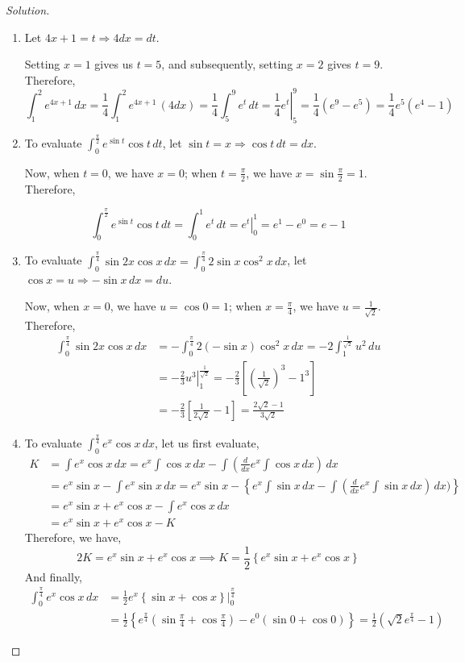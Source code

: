 \documentclass{book}
\theoremstyle{definition}
\newenvironment{solution}
    {\begin{proof}[Solution]}
    {\end{proof}}
\begin{document}
\begin{solution}
\begin{enumerate}[label=(\roman*)]
\item Let $4x+1=t\Rightarrow 4dx=dt$. 

Setting $x=1$ gives us $t=5$, and subsequently, setting $x=2$ gives $t=9$. Therefore,
\[
\int _{1}^{2}e^{4x+1} \, dx =\frac{1}{4}\int _{1}^{2}e^{4x+1} \, (4dx)=\frac{1}{4}\int _{5}^{9}e^t \,dt= \left.\frac{1}{4}e^t\right\vert_5^9=\frac{1}{4}(e^9-e^5)=\frac{1}{4}e^5(e^4-1)
\]




\item To evaluate $\displaystyle\int_{0}^{\frac{\pi}{2}}e^{\sin t}\cos t\,dt$, let $\sin t=x\Rightarrow \cos t\,dt=dx$. 

Now, when $t=0$, we have $x=0$; when $t=\frac{\pi}{2}$, we have $x=\sin \frac{\pi}{2}=1$. Therefore,

\[
\int_{0}^{\frac{\pi}{2}}e^{\sin t}\cos t\,dt = \int_0^1e^t\,dt=\left.e^t\right\vert_0^1=e^1-e^0=e-1
\]

\item To evaluate $\displaystyle\int_{0}^{\frac{\pi}{4}} \sin 2x\cos x\,dx = \displaystyle\int_{0}^{\frac{\pi}{4}} 2\sin x\cos^2 x\,dx$, let $\cos x=u \Rightarrow -\sin x\,dx=du$. 

Now, when $x=0$, we have $u=\cos 0 = 1$; when $x=\frac{\pi}{4}$, we have $u=\frac{1}{\sqrt{2}}$. Therefore,
\begin{align*}
\int_{0}^{\frac{\pi}{4}} \sin 2x\cos x\,dx&=-\int_{0}^{\frac{\pi}{4}} 2(-\sin x)\cos^2 x\,dx=-2\int_1^{\frac{1}{\sqrt{2}}}u^2\,du    \\
&= -\left.\frac{2}{3}u^3\right\vert_1^{\frac{1}{\sqrt{2}}} = -\frac{2}{3}\left[(\frac{1}{\sqrt{2}})^3-1^3\right] \\
&= -\frac{2}{3}\left[\frac{1}{2\sqrt{2}}-1\right] = \frac{2\sqrt{2}-1}{3\sqrt{2}}
\end{align*}



\item To evaluate $\displaystyle\int_{0}^{\frac{\pi}{4}} e^x\cos x\,dx$, let us first evaluate,
\begin{align*}
K&=\displaystyle\int e^x\cos x\,dx = e^x\int\cos x\,dx-\int\left(\frac{d}{dx}e^x\int\cos x\,dx\right)\,dx \\
&=e^x\sin x-\int e^x\sin x\,dx = e^x\sin x-\left\{e^x\int\sin x\,dx-\int\left(\frac{d}{dx}e^x\int\sin x\,dx\right)\,dx)\right\} \\
&= e^x\sin x+e^x\cos x-\int e^x\cos x\,dx \\
&= e^x\sin x+e^x\cos x-K
\end{align*}
Therefore, we have,
\[
2K=e^x\sin x+e^x\cos x \implies K = \frac{1}{2}\left\{e^x\sin x+e^x\cos x\right\}
\]
And finally,
\begin{align*}
\int_{0}^{\frac{\pi}{4}} e^x\cos x\,dx &= \frac{1}{2}e^x\left.\left\{\sin x+\cos x\right\}\right\vert_0^{\frac{\pi}{4}} \\
&= \frac{1}{2}\left\{e^{\frac{\pi}{4}}\left(\sin {\frac{\pi}{4}}+\cos {\frac{\pi}{4}}\right)-e^0\left(\sin 0+\cos 0\right)\right\} = \frac{1}{2}(\sqrt{2}e^{\frac{\pi}{4}}-1)
\end{align*}



\end{enumerate}
\end{solution}
\end{document}

